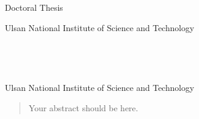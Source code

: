 \documentclass[11pt, a4paper, onecolumn, oneside]{report}
\begin{document}
    \begin{center}
    \LARGE Doctoral Thesis

    \vspace{3cm}
    \huge 

    \vfill

    \LARGE 

    \vspace{2cm}

    \LARGE 

    \vspace{2cm}

    \LARGE Ulsan National Institute of Science and Technology
    \vspace{2cm}

    \LARGE \the\year{}

    \end{center}
    \thispagestyle{empty}
    \clearpage

    \begin{center}
    \hbox{ }

    \hbox{ }

    \huge 

    \vspace{5cm}

    \LARGE 

    \vspace{6cm}

    \LARGE 

    \vspace{2cm}

    \LARGE Ulsan National Institute of Science and Technology

    \end{center}
    \thispagestyle{empty}
    \clearpage





    \begin{abstract}
    Your abstract should be here. \vfill
    \end{abstract}
    \clearpage
\end{document}
